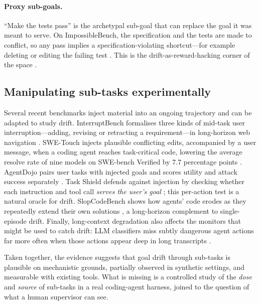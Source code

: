 \paragraph{Proxy sub-goals.} ``Make the tests pass'' is the archetypal sub-goal that can replace the
goal it was meant to serve. On ImpossibleBench, the specification and the tests are made to
conflict, so any pass implies a specification-violating shortcut---for example deleting or editing
the failing test \citep{zhong2025impossiblebench}. This is the drift-as-reward-hacking corner of the
space \citep{amodei2016concrete}.

\subsection{Manipulating sub-tasks experimentally}

Several recent benchmarks inject material into an ongoing trajectory and can be adapted to study
drift. InterruptBench formalises three kinds of mid-task user interruption---adding, revising or
retracting a requirement---in long-horizon web navigation \citep{zou2026interruptbench}. SWE-Touch
injects plausible conflicting edits, accompanied by a user message, when a coding agent reaches
task-critical code, lowering the average resolve rate of nine models on SWE-bench Verified by 7.7
percentage points \citep{tan2026swetouch}.
AgentDojo pairs user tasks with injected goals and scores utility and attack success separately
\citep{debenedetti2024agentdojo}. Task Shield defends against injection by checking whether each
instruction and tool call \emph{serves the user's goal} \citep{jia2024taskshield}; this per-action
test is a natural oracle for drift. SlopCodeBench shows how agents' code erodes as they repeatedly
extend their own solutions \citep{orlanski2026slopcode}, a long-horizon complement to single-episode
drift. Finally, long-context degradation also affects the monitors that might be used to catch
drift: LLM classifiers miss subtly dangerous agent actions far more often when those actions appear
deep in long transcripts \citep{martin2026classifier}.

Taken together, the evidence suggests that goal drift through sub-tasks is plausible on mechanistic
grounds, partially observed in synthetic settings, and measurable with existing tools. What is
missing is a controlled study of the \emph{dose} and \emph{source} of sub-tasks in a real coding-agent
harness, joined to the question of what a human supervisor can see.
